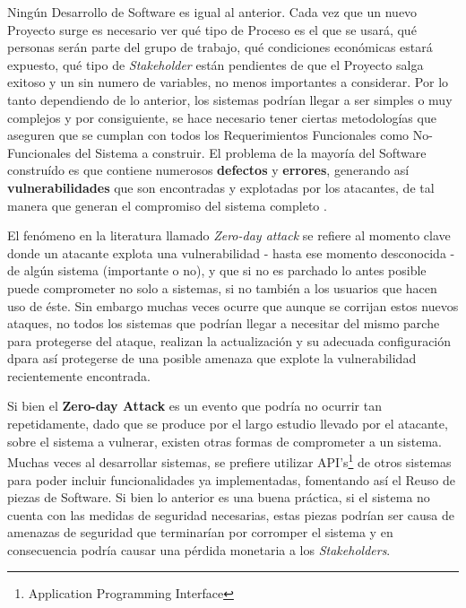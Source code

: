 Ningún Desarrollo de Software es igual al anterior. Cada vez que un nuevo Proyecto surge es necesario ver qué tipo de Proceso es el que se usará, qué personas serán parte del grupo de trabajo, qué condiciones económicas estará expuesto, qué tipo de \textit{Stakeholder} están pendientes de que el Proyecto salga exitoso y un sin numero de variables, no menos importantes a considerar. Por lo tanto dependiendo de lo anterior, los sistemas podrían llegar a ser simples o muy complejos y por consiguiente, se hace necesario tener ciertas metodologías que aseguren que se cumplan con todos los Requerimientos Funcionales como No-Funcionales del Sistema a construir. El problema de la mayoría del Software construído es que contiene numerosos \textbf{defectos} y \textbf{errores}, generando así \textbf{vulnerabilidades} que son encontradas y explotadas por los atacantes, de tal manera que generan el compromiso del sistema completo \cite{goertzel2007software}.

El fenómeno en la literatura llamado \textit{Zero-day attack} se refiere al momento clave donde un atacante explota una vulnerabilidad - hasta ese momento desconocida - de algún sistema (importante o no), y que si no es parchado lo antes posible puede comprometer no solo a sistemas, si no también a los usuarios que hacen uso de éste. Sin embargo muchas veces ocurre que aunque se corrijan estos nuevos ataques, no todos los sistemas que podrían llegar a necesitar del mismo parche para protegerse del ataque, realizan la actualización y su adecuada configuración dpara así protegerse de una posible amenaza que explote la vulnerabilidad recientemente encontrada.

Si bien el \textbf{Zero-day Attack} es un evento que podría no ocurrir tan repetidamente, dado que se produce por el largo estudio llevado por el atacante, sobre el sistema a vulnerar, existen otras formas de comprometer a un sistema. Muchas veces al desarrollar sistemas, se prefiere utilizar API's\footnote{Application Programming Interface} de otros sistemas para poder incluir funcionalidades ya implementadas, fomentando así el Reuso de piezas de Software. Si bien lo anterior es una buena práctica, si el sistema no cuenta con las medidas de seguridad necesarias, estas piezas podrían ser causa de amenazas de seguridad que terminarían por corromper el sistema y en consecuencia podría causar una pérdida monetaria a los \textit{Stakeholders}. 

